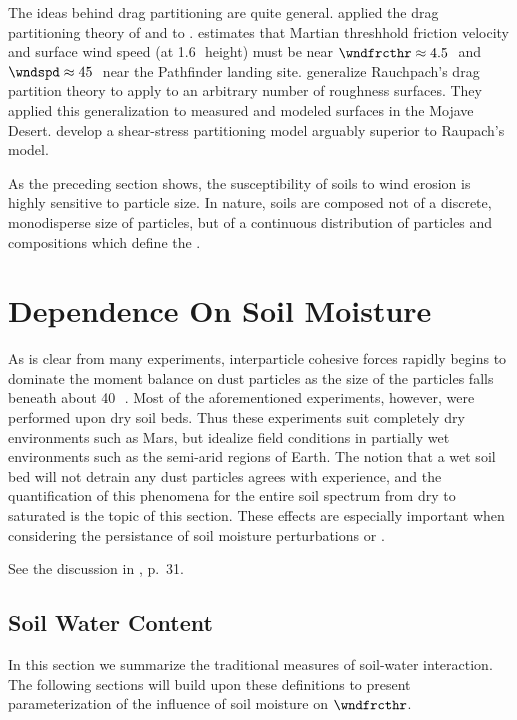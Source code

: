 \documentclass[12pt,twoside]{book}
\begin{document}
The ideas behind drag partitioning are quite general.
\cite{Sul02} applied the drag partitioning theory of \cite{Rau92} and
\cite{RGL93} to .
\citeauthor{Sul02} estimates that Martian threshhold friction velocity
and surface wind speed (at 1.6\,\m\ height) must be near 
$\wndfrcthr \approx 4.5$\,\mxs\ and $\wndspd \approx 45$\,\mxs\ near
the Pathfinder landing site.
\cite{MCT04} generalize Rauchpach's drag partition theory to apply to 
an arbitrary number of roughness surfaces.
They applied this generalization to measured and modeled surfaces in
the Mojave Desert.
\cite{Oki08} develop a shear-stress partitioning model arguably
superior to Raupach's model.

As the preceding section shows, the susceptibility of soils to wind
erosion is highly sensitive to particle size. 
In nature, soils are composed not of a discrete, monodisperse size of
particles, but of a continuous distribution of particles and
compositions which define the .

\section{Dependence On Soil Moisture}\label{sxn:mst}
As is clear from many experiments, interparticle cohesive forces
rapidly begins to dominate the moment balance on dust particles as 
the size of the particles falls beneath about 40\,\um\
\cite{Whi79,IvW82,GrI85}.
Most of the aforementioned experiments, however, were performed upon
dry soil beds.
Thus these experiments suit completely dry environments such as Mars,
but idealize field conditions in partially wet environments such as
the semi-arid regions of Earth.
The notion that a wet soil bed will not detrain any dust particles
agrees with experience, and the quantification of this phenomena for 
the entire soil spectrum from dry to saturated is the topic of this
section. 
These effects are especially important when considering the
persistance of soil moisture perturbations or \trmdfn{soil moisture
  memory} \cite[e.g.,][]{KoS01}. 

See the discussion in \cite{Pye87}, p.~31.

\subsection[Soil Water Content]{Soil Water Content}\label{sxn:swc}
In this section we summarize the traditional measures of soil-water
interaction. 
The following sections will build upon these definitions to present 
parameterization of the influence of soil moisture on $\wndfrcthr$.
\end{document}
